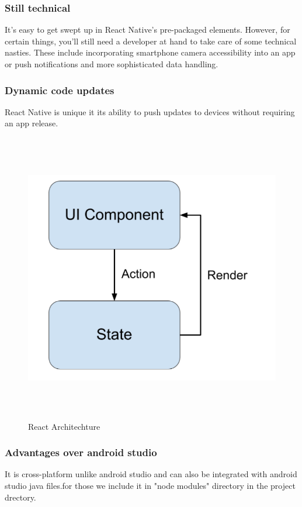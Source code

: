 \subsubsection{Still technical}
It’s easy to get swept up in React Native’s pre-packaged elements. However, for certain things, you'll still need a developer at hand to take care of some technical nasties.
These include incorporating smartphone camera accessibility into an app or push notifications and more sophisticated data handling.

\subsubsection{Dynamic code updates}
React Native is unique it its ability to push updates to devices without requiring an app release.\\
\begin{figure}[!h]
	\centering
	\includegraphics[height=5in]{reactArch.PNG}
	\caption{React Architechture}
	
\end{figure}

\subsubsection{Advantages over android studio}
It is cross-platform unlike android studio and can also be integrated with android studio java files.for those we include it in "node modules" directory in the project drectory.

